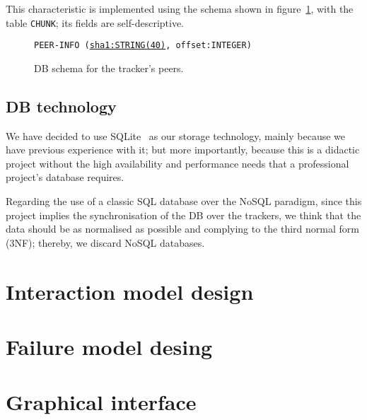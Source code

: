 \documentclass[twoside,a4paper,10pt]{article}
\begin{document}
This characteristic is implemented using the schema shown in
figure~\ref{fig:schema-P}, with the table \texttt{CHUNK}; its
fields are self-descriptive.

\begin{figure}[h]
  
  \texttt{PEER-INFO (\underline{sha1:STRING(40)}, offset:INTEGER)}
  
  \centering
  \caption{\label{fig:schema-P}DB schema for the tracker's peers.}
\end{figure}

\subsection{DB technology}

We have decided to use SQLite~\cite{sqlite} as our storage technology,
mainly because we have previous experience with it; but more importantly,
because this is a didactic project without the high availability and performance
needs that a professional project's database requires.

Regarding the use of a classic SQL database over the NoSQL paradigm, since
this project implies the synchronisation of the DB over the trackers, we think
that the data should be as normalised as possible and complying to the third
normal form (3NF); thereby, we discard NoSQL databases.

\section{Interaction model design}

\section{Failure model desing}

\section{Graphical interface}




\end{document}

